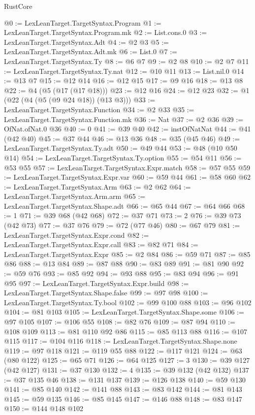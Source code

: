 \begin{lexlean}{RustCore}
\begin{coremodule}
@0 := LexLeanTarget.TargetSyntax.Program
@1 := LexLeanTarget.TargetSyntax.Program.mk
@2 := List.cons.{0}
@3 := LexLeanTarget.TargetSyntax.Adt
@4 := @2 @3
@5 := LexLeanTarget.TargetSyntax.Adt.mk
@6 := List.{0}
@7 := LexLeanTarget.TargetSyntax.Ty
@8 := @6 @7
@9 := @2 @8
@10 := @2 @7
@11 := LexLeanTarget.TargetSyntax.Ty.nat
@12 := @10 @11
@13 := List.nil.{0}
@14 := @13 @7
@15 := @12 @14
@16 := @12 @15
@17 := @9 @16
@18 := @13 @8
@22 := @4 (@5 (@17 (@17 @18)))
@23 := @12 @16
@24 := @12 @23
@32 := @1 (@22 (@4 (@5 (@9 @24 @18)) (@13 @3)))
@33 := LexLeanTarget.TargetSyntax.Function
@34 := @2 @33
@35 := LexLeanTarget.TargetSyntax.Function.mk
@36 := Nat
@37 := @2 @36
@39 := OfNat.ofNat.{0} @36
@40 := 0
@41 := @39 @40
@42 := instOfNatNat
@44 := @41 (@42 @40)
@45 := @37 @44
@46 := @13 @36
@48 := @35 (@45 @46)
@49 := LexLeanTarget.TargetSyntax.Ty.adt
@50 := @49 @44
@53 := @48 (@10 @50 @14)
@54 := LexLeanTarget.TargetSyntax.Ty.option
@55 := @54 @11
@56 := @53 @55
@57 := LexLeanTarget.TargetSyntax.Expr.match
@58 := @57 @55
@59 := LexLeanTarget.TargetSyntax.Expr.var
@60 := @59 @44
@61 := @58 @60
@62 := LexLeanTarget.TargetSyntax.Arm
@63 := @2 @62
@64 := LexLeanTarget.TargetSyntax.Arm.arm
@65 := LexLeanTarget.TargetSyntax.Shape.adt
@66 := @65 @44
@67 := @64 @66
@68 := 1
@71 := @39 @68 (@42 @68)
@72 := @37 @71
@73 := 2
@76 := @39 @73 (@42 @73)
@77 := @37 @76
@79 := @72 (@77 @46)
@80 := @67 @79
@81 := LexLeanTarget.TargetSyntax.Expr.cond
@82 := LexLeanTarget.TargetSyntax.Expr.call
@83 := @82 @71
@84 := LexLeanTarget.TargetSyntax.Expr
@85 := @2 @84
@86 := @59 @71
@87 := @85 @86
@88 := @13 @84
@89 := @87 @88
@90 := @83 @89
@91 := @81 @90
@92 := @59 @76
@93 := @85 @92
@94 := @93 @88
@95 := @83 @94
@96 := @91 @95
@97 := LexLeanTarget.TargetSyntax.Expr.build
@98 := LexLeanTarget.TargetSyntax.Shape.false
@99 := @97 @98
@100 := LexLeanTarget.TargetSyntax.Ty.bool
@102 := @99 @100 @88
@103 := @96 @102
@104 := @81 @103
@105 := LexLeanTarget.TargetSyntax.Shape.some
@106 := @97 @105
@107 := @106 @55
@108 := @82 @76
@109 := @87 @94
@110 := @108 @109
@113 := @81 @110 @92 @86
@115 := @85 @113 @88
@116 := @107 @115
@117 := @104 @116
@118 := LexLeanTarget.TargetSyntax.Shape.none
@119 := @97 @118
@121 := @119 @55 @88
@122 := @117 @121
@124 := @63 (@80 @122)
@125 := @65 @71
@126 := @64 @125
@127 := 3
@130 := @39 @127 (@42 @127)
@131 := @37 @130
@132 := 4
@135 := @39 @132 (@42 @132)
@137 := @37 @135 @46
@138 := @131 @137
@139 := @126 @138
@140 := @59 @130
@141 := @85 @140
@142 := @141 @88
@143 := @83 @142
@144 := @81 @143
@145 := @59 @135
@146 := @85 @145
@147 := @146 @88
@148 := @83 @147
@150 := @144 @148 @102

\end{coremodule}
\end{lexlean}
